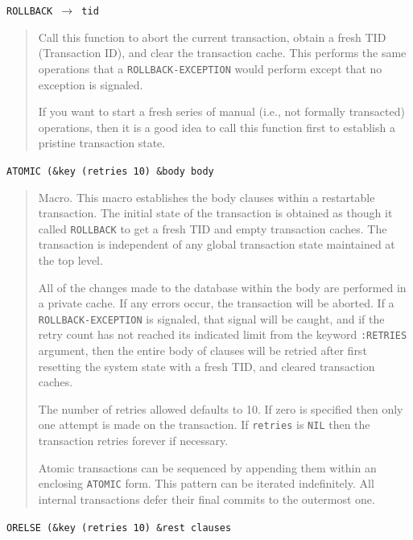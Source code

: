 \documentclass[article,oneside]{memoir}
\begin{document}
\noindent \texttt{ROLLBACK $\rightarrow$ tid}

\begin{quote}

Call this function to abort the current transaction, obtain a fresh TID (Transaction ID), and clear the transaction cache. This performs the same operations that a \texttt{ROLLBACK-EXCEPTION} would perform except that no exception is signaled.

If you want to start a fresh series of manual (i.e., not formally transacted) operations, then it is a good idea to call this function first to establish a pristine transaction state.
\end{quote}

\noindent \texttt{ATOMIC (\&key (retries 10) \&body body}

\begin{quote}

Macro. This macro establishes the body clauses within a restartable transaction. The initial state of the transaction is obtained as though it called \texttt{ROLLBACK} to get a fresh TID and empty transaction caches. The transaction is independent of any global transaction state maintained at the top level.

All of the changes made to the database within the body are performed in a private cache. If any errors occur, the transaction will be aborted. If a \texttt{ROLLBACK-EXCEPTION} is signaled, that signal will be caught, and if the retry count has not reached its indicated limit from the keyword \texttt{:RETRIES} argument, then the entire body of clauses will be retried after first resetting the system state with a fresh TID, and cleared transaction caches.

The number of retries allowed defaults to 10. If zero is specified then only one attempt is made on the transaction. If \texttt{retries} is \texttt{NIL} then the transaction retries forever if necessary.

Atomic transactions can be sequenced by appending them within an enclosing \texttt{ATOMIC} form. This pattern can be iterated indefinitely. All internal transactions defer their final commits to the outermost one.
\end{quote}

\noindent \texttt{ORELSE (\&key (retries 10) \&rest clauses}
\end{document}
